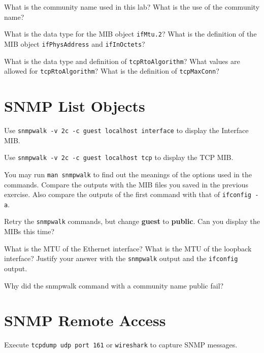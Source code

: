 \documentclass{../UTNetLab}
\begin{document}
    \begin{report}
    \item What is the community name used in this lab? What is the use of the
    community name?
    
    \item What is the data type for the MIB object \texttt{ifMtu.2}? What is the definition of the MIB object \texttt{ifPhysAddress} and \texttt{ifInOctets}?
    
    \item What is the data type and definition of \texttt{tcpRtoAlgorithm}? What values are allowed for \texttt{tcpRtoAlgorithm}? What is the definition of \texttt{tcpMaxConn}?
    \end{report}

\section{SNMP List Objects}
    Use \lstinline[emph=guest]{snmpwalk -v 2c -c guest localhost interface} to display the Interface MIB.

    Use \lstinline[emph=guest]{snmpwalk -v 2c -c guest localhost tcp} to display the TCP MIB.

    You may run \lstinline{man snmpwalk} to find out the meanings of the options used in the commands. Compare the outputs with the MIB files you saved in the previous exercise. Also compare the outputs of the first command with that of \lstinline{ifconfig -a}.

    Retry the \lstinline{snmpwalk} commands, but change \textbf{guest} to \textbf{public}. Can you display the MIBs this time?
    
    \begin{report}
    \item What is the MTU of the Ethernet interface? What is the MTU of the loopback interface? Justify your answer with the \lstinline{snmpwalk} output and the \lstinline{ifconfig} output.
    
    \item Why did the snmpwalk command with a community name public fail?
    \end{report}

\section{SNMP Remote Access}
    Execute \lstinline{tcpdump udp port 161} or \lstinline{wireshark} to capture SNMP messages.
\end{document}
